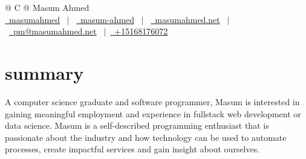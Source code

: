 \documentclass[letterpaper,10pt]{article}
\begin{document}
\pagestyle{empty} 


\begin{tabularx}{\linewidth}{@{} C @{}}
\Huge{Masum Ahmed} \\[9pt]

\href{https://github.com/masumahmed}{\raisebox{-0.05\height}\faGithub\ masumahmed} \ $|$ \ 
\href{https://linkedin.com/in/masum-ahmed}{\raisebox{-0.05\height}\faLinkedin\ masum-ahmed} \ $|$ \ 
\href{https://masumahmed.github.io}{\raisebox{-0.05\height}\faGlobe \ masumahmed.net} \ $|$ \ 
\href{mailto:pm@masumahmed.net}{\raisebox{-0.05\height}\faEnvelope \ pm@masumahmed.net} \ $|$\ 
\href{tel:+15168176072}{\raisebox{-0.05\height}\faPhone \ +15168176072} \\ 
\end{tabularx}
\section{summary}
A computer science graduate and software programmer, Masum is interested in gaining meaningful employment and experience in fullstack web development or data science. Masum is a self-described programming enthusiast that is passionate about the industry and how technology can be used to automate processes, create impactful services and gain insight about ourselves.
\end{document}
